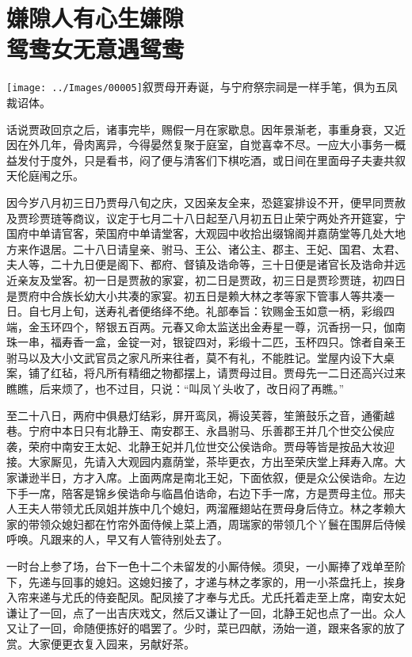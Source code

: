 
\chapter{嫌隙人有心生嫌隙\\鸳鸯女无意遇鸳鸯}

{\texttt{[image: ../Images/00005]}\kaishu 叙贾母开寿诞，与宁府祭宗祠是一样手笔，俱为五凤裁诏体。}

话说贾政回京之后，诸事完毕，赐假一月在家歇息。因年景渐老，事重身衰，又近因在外几年，骨肉离异，今得晏然复聚于庭室，自觉喜幸不尽。一应大小事务一概益发付于度外，只是看书，闷了便与清客们下棋吃酒，或日间在里面母子夫妻共叙天伦庭闱之乐。

因今岁八月初三日乃贾母八旬之庆，又因亲友全来，恐筵宴排设不开，便早同贾赦及贾珍贾琏等商议，议定于七月二十八日起至八月初五日止荣宁两处齐开筵宴，宁国府中单请官客，荣国府中单请堂客，大观园中收拾出缀锦阁并嘉荫堂等几处大地方来作退居。二十八日请皇亲、驸马、王公、诸公主、郡主、王妃、国君、太君、夫人等，二十九日便是阁下、都府、督镇及诰命等，三十日便是诸官长及诰命并远近亲友及堂客。初一日是贾赦的家宴，初二日是贾政，初三日是贾珍贾琏，初四日是贾府中合族长幼大小共凑的家宴。初五日是赖大林之孝等家下管事人等共凑一日。自七月上旬，送寿礼者便络绎不绝。礼部奉旨：钦赐金玉如意一柄，彩缎四端，金玉环四个，帑银五百两。元春又命太监送出金寿星一尊，沉香拐一只，伽南珠一串，福寿香一盒，金锭一对，银锭四对，彩缎十二匹，玉杯四只。馀者自亲王驸马以及大小文武官员之家凡所来往者，莫不有礼，不能胜记。堂屋内设下大桌案，铺了红毡，将凡所有精细之物都摆上，请贾母过目。贾母先一二日还高兴过来瞧瞧，后来烦了，也不过目，只说：``叫凤丫头收了，改日闷了再瞧。''

至二十八日，两府中俱悬灯结彩，屏开鸾凤，褥设芙蓉，笙箫鼓乐之音，通衢越巷。宁府中本日只有北静王、南安郡王、永昌驸马、乐善郡王并几个世交公侯应袭，荣府中南安王太妃、北静王妃并几位世交公侯诰命。贾母等皆是按品大妆迎接。大家厮见，先请入大观园内嘉荫堂，茶毕更衣，方出至荣庆堂上拜寿入席。大家谦逊半日，方才入席。上面两席是南北王妃，下面依叙，便是众公侯诰命。左边下手一席，陪客是锦乡侯诰命与临昌伯诰命，右边下手一席，方是贾母主位。邢夫人王夫人带领尤氏凤姐并族中几个媳妇，两溜雁翅站在贾母身后侍立。林之孝赖大家的带领众媳妇都在竹帘外面侍候上菜上酒，周瑞家的带领几个丫鬟在围屏后侍候呼唤。凡跟来的人，早又有人管待别处去了。

一时台上参了场，台下一色十二个未留发的小厮侍候。须臾，一小厮捧了戏单至阶下，先递与回事的媳妇。这媳妇接了，才递与林之孝家的，用一小茶盘托上，挨身入帘来递与尤氏的侍妾配凤。配凤接了才奉与尤氏。尤氏托着走至上席，南安太妃谦让了一回，点了一出吉庆戏文，然后又谦让了一回，北静王妃也点了一出。众人又让了一回，命随便拣好的唱罢了。少时，菜已四献，汤始一道，跟来各家的放了赏。大家便更衣复入园来，另献好茶。

